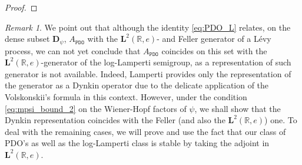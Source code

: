 \documentclass[12pt]{amsart}
\numberwithin{equation}{section}
\newcommand{\bb}{\mathbb}
\newcommand{\ttt}{\mathtt}
\newcommand{\bmrm}[2][2]{\mathbf{#2}^{#1}}
\newcommand{\D}{\mathbf{D}}
\theoremstyle{definition}
\theoremstyle{assump}
\theoremstyle{remark}
\newtheorem{rem}[thm]{Remark}
\begin{document}
{\begin{proof}
\end{proof}
\begin{rem} \label{rem:PDO_Dynk}
We point out that although the identity \eqref{eq:PDO_L} relates, on the dense subset $\D_\psi$, $A_\ttt{PDO}$ with the $\bmrm{L}(\bb{R},e)$- and  Feller generator of a L\'evy process, we can not yet conclude that  $A_\ttt{PDO}$ coincides on this set with the $\bmrm{L}(\bb{R}, e)$-generator of the log-Lamperti semigroup, as a representation of such generator is not available. Indeed, Lamperti \cite{Lamperti1972} provides only the representation of the generator as a Dynkin operator due to the delicate application  of the Volskonskii's formula in this context. However, under the condition \eqref{eq:mpsi_bound_2} on the Wiener-Hopf factors of $\psi$, we shall show that the Dynkin representation coincides with the Feller (and also the $\bmrm{L}(\bb{R}, e)$) one. To deal with the remaining cases, we will prove and use the fact  that our class of PDO's as well as the log-Lamperti class is stable by taking the adjoint in $\bmrm{L}(\bb{R}, e)$.
\end{rem}
}
\end{document}
